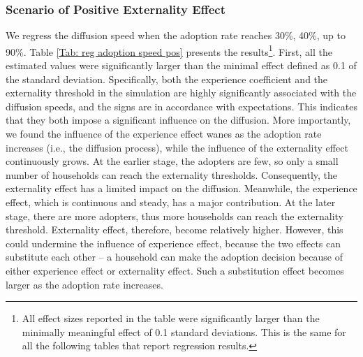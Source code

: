 \documentclass{bmcart}
\renewcommand{\tablename}{Table }
\begin{document}
\subsubsection*{Scenario of Positive Externality Effect}
\label{Sec: experience effect and externality effect pos}
We regress the diffusion speed when the adoption rate reaches 30\%, 40\%, up to 90\%. \tablename \ref{Tab: reg adoption speed pos} presents the results\footnote{All effect sizes reported in the table were significantly larger than the minimally meaningful effect of 0.1 standard deviations. This is the same for all the following tables that report regression results.}. First, all the estimated values were significantly larger than the minimal effect defined as 0.1 of the standard deviation. Specifically, both the experience coefficient and the externality threshold in the simulation are highly significantly associated with the diffusion speeds, and the signs are in accordance with expectations. This indicates that they both impose a significant influence on the diffusion. More importantly, we found the influence of the experience effect wanes as the adoption rate increases (i.e., the diffusion process), while the influence of the externality effect continuously grows. At the earlier stage, the adopters are few, so only a small number of households can reach the externality thresholds. Consequently, the externality effect has a limited impact on the diffusion. Meanwhile, the experience effect, which is continuous and steady, has a major contribution. At the later stage, there are more adopters, thus more households can reach the externality threshold. Externality effect, therefore, become relatively higher. However, this could undermine the influence of experience effect, because the two effects can substitute each other -- a household can make the adoption decision because of either experience effect or externality effect. Such a substitution effect becomes larger as the adoption rate increases.
\end{document}
